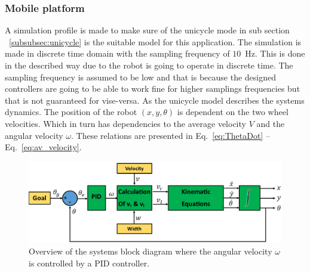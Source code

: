 \subsubsection{Mobile platform}
A simulation profile is made to make sure of the unicycle mode in sub section ~\ref{subsubsec:unicycle} is the suitable model for this application.
The simulation is made in discrete time domain with the sampling frequency of $10$~Hz.
This is done in the described way due to the robot is going to operate in discrete time.
The sampling frequency is assumed to be low and that is because the designed controllers are going to be able to work fine for higher samplings frequencies but that is not guaranteed for vise-versa.
As the unicycle model describes the systems dynamics.
The position of the robot $(x, y, \theta)$ is dependent on the two wheel velocities. Which in turn has dependencies to the average velocity $V$ and the angular velocity $\omega$. These relations are presented in Eq.~\eqref{eq:ThetaDot} -- Eq.~\eqref{eq:av_velocity}.
\begin{figure}[h]
\centering
\includegraphics[width=\textwidth]{sections/assets/omegaCtrlr.png}
\caption{Overview of the systems block diagram where the angular velocity $\omega$ is controlled by a PID controller.}
\label{fig:overview}
\end{figure}

